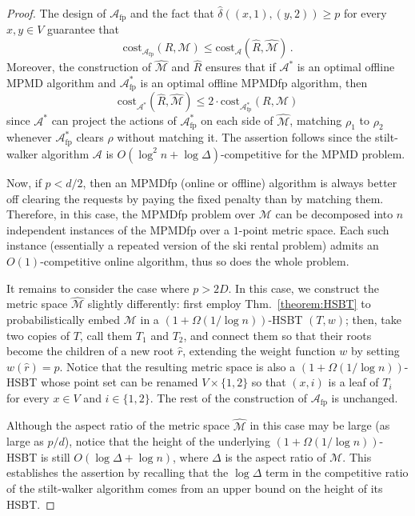 \documentclass[11pt]{article}
\def\LongVersionEnd{}
\theoremstyle{definition}
\theoremstyle{plain}
\theoremstyle{definition}
\theoremstyle{plain}
\theoremstyle{definition}
\theoremstyle{plain}
\newcommand{\Thm}{Thm.}
\newcommand{\Cost}{\mathrm{cost}}
\newcommand{\A}{\mathcal{A}}
\newcommand{\adv}[1]{{#1}^{*}}
\begin{document}
\begin{proof}
The design of $\A_{\text{fp}}$ and the fact that
$\widehat{\delta}((x, 1), (y, 2)) \geq p$
for every $x, y \in V$
guarantee that
\begin{equation} \label{equation:fp-online}
\Cost_{\A_{\text{fp}}}(R, \mathcal{M}) \leq \Cost_{\A}(\widehat{R},
\widehat{\mathcal{M}}) \, .
\end{equation}
Moreover, the construction of $\widehat{\mathcal{M}}$ and $\widehat{R}$
ensures that if $\adv{\A}$ is an optimal offline MPMD algorithm and
$\adv{\A}_{\text{fp}}$ is an optimal offline MPMDfp algorithm, then
\begin{equation} \label{equation:fp-benchmark}
\Cost_{\adv{\A}}(\widehat{R}, \widehat{\mathcal{M}})
\leq
2 \cdot \Cost_{\adv{\A}_{\text{fp}}}(R, \mathcal{M})
\end{equation}
since $\adv{\A}$ can project the actions of $\adv{\A}_{\text{fp}}$ on each
side of $\widehat{\mathcal{M}}$, matching $\rho_{1}$ to $\rho_{2}$ whenever
$\adv{\A}_{\text{fp}}$ clears $\rho$ without matching it.
The assertion follows since the stilt-walker algorithm $\A$ is $O (\log^{2} n
+ \log \Delta)$-competitive for the MPMD problem.

Now, if
$p < d / 2$,
then an MPMDfp (online or offline) algorithm is always better off clearing the
requests by paying the fixed penalty than by matching them.
Therefore, in this case, the MPMDfp problem over $\mathcal{M}$ can be
decomposed into $n$ independent instances of the MPMDfp over a $1$-point
metric space.
Each such instance (essentially a repeated version of the ski rental problem)
admits an $O (1)$-competitive online algorithm, thus so does the whole
problem.

It remains to consider the case where
$p > 2 D$.
In this case, we construct the metric space $\widehat{\mathcal{M}}$ slightly
differently:
first employ \Thm{}~\ref{theorem:HSBT} to probabilistically embed
$\mathcal{M}$ in a $(1 + \Omega (1 / \log n))$-HSBT $(T, w)$;
then, take two copies of $T$, call them $T_{1}$ and $T_{2}$, and connect them
so that their roots become the children of a new root $\widehat{r}$, extending
the weight function $w$ by setting
$w(\widehat{r}) = p$.
Notice that the resulting metric space is also a $(1 + \Omega (1 / \log
n))$-HSBT whose point set can be renamed
$V \times \{ 1, 2 \}$
so that $(x, i)$ is a leaf of $T_{i}$ for every
$x \in V$
and
$i \in \{ 1, 2 \}$.
The rest of the construction of $\A_{\text{fp}}$ is unchanged.

Although the aspect ratio of the metric space $\widehat{\mathcal{M}}$ in this
case may be large (as large as
$p / d$),
notice that the height of the underlying $(1 + \Omega (1 / \log n))$-HSBT is
still $O (\log \Delta + \log n)$,
where $\Delta$ is the aspect ratio of $\mathcal{M}$.
This establishes the assertion by recalling that the $\log \Delta$ term in the
competitive ratio of the stilt-walker algorithm comes from an upper bound on
the height of its HSBT.
\end{proof}
\LongVersionEnd %
\end{document}
